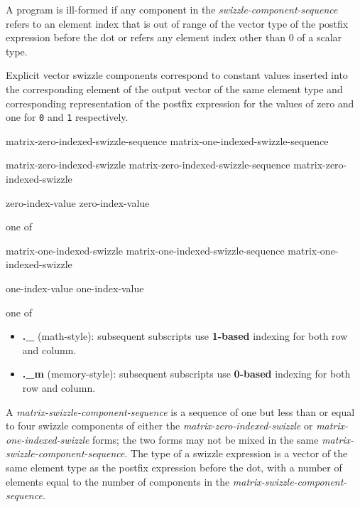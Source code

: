 \p A program is ill-formed if any component in the
\textit{swizzle-component-sequence} refers to an element index that is out of
range of the vector type of the postfix expression before the dot or refers any
element index other than 0 of a scalar type.

\p Explicit vector swizzle components correspond to constant values inserted
into the corresponding element of the output vector of the same element type and
corresponding representation of the postfix expression for the values of zero
and one for \texttt{0} and \texttt{1} respectively.

\begin{grammar}
  \br
  matrix-zero-indexed-swizzle-sequence\br
  matrix-one-indexed-swizzle-sequence\br

  \br
  matrix-zero-indexed-swizzle\br
  matrix-zero-indexed-swizzle-sequence matrix-zero-indexed-swizzle\br

  \br
   zero-index-value zero-index-value\br

   \textnormal{one of}\br
  \br

  \br
  matrix-one-indexed-swizzle\br
  matrix-one-indexed-swizzle-sequence matrix-one-indexed-swizzle\br

  \br
  \terminal{\_} one-index-value one-index-value\br

   \textnormal{one of}\br
  \br
\end{grammar}

\begin{itemize}
\item \textbf{.\_} (math-style): subsequent subscripts use \textbf{1-based}
 indexing for both row and column.
\item \textbf{.\_m} (memory-style): subsequent subscripts use \textbf{0-based}
 indexing for both row and column.
\end{itemize}

\p A \textit{matrix-swizzle-component-sequence} is a sequence of one but less
than or equal to four swizzle components of either the
\textit{matrix-zero-indexed-swizzle} or \textit{matrix-one-indexed-swizzle}
forms; the two forms may not be mixed in the same
\textit{matrix-swizzle-component-sequence}. The type of a swizzle expression is
a vector of the same element type as the postfix expression before the dot,
with a number of elements equal to the number of components in the
\textit{matrix-swizzle-component-sequence}.

